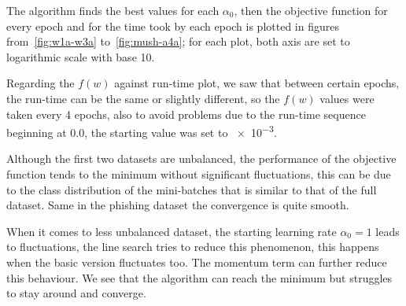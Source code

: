 The algorithm finds the best values for each $\alpha_0$, then the objective function for every epoch and for the time took by each epoch is plotted in figures from~\vref{fig:w1a-w3a} to~\ref{fig:mush-a4a}; for each plot, both axis are set to logarithmic scale with base 10.

Regarding the $f(w)$ against run-time plot, we saw that between certain epochs, the run-time can be the same or slightly different, so the $f(w)$ values were taken every 4 epochs, also to avoid problems due to the run-time sequence beginning at \num{0.0}, the starting value was set to \num{e-3}.\par\smallskip




Although the first two datasets are unbalanced, the performance of the objective function tends to the minimum without significant fluctuations, this can be due to the class distribution of the mini-batches that is similar to that of the full dataset. Same in the phishing dataset the convergence is quite smooth.

When it comes to less unbalanced dataset, the starting learning rate $\alpha_0=1$ leads to fluctuations, the line search tries to reduce this phenomenon, this happens when the basic version fluctuates too. The momentum term can further reduce this behaviour. We see that the algorithm can reach the minimum but struggles to stay around and converge.



